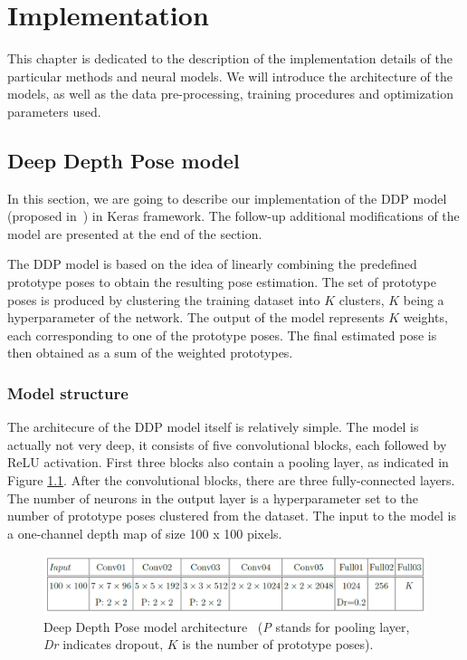 \chapter{Implementation}\label{chap:implementation}
This chapter is dedicated to the description of the implementation details of the particular methods and neural models. We will introduce the architecture of the models, as well as the data pre-processing, training procedures and optimization parameters used.

\section{Deep Depth Pose model}
In this section, we are going to describe our implementation of the DDP model (proposed in~\cite{Marin18jvcir}) in Keras framework. The follow-up additional modifications of the model are presented at the end of the section.\par
\vspace{5mm}
\noindent
The DDP model is based on the idea of linearly combining the predefined prototype poses to obtain the resulting pose estimation. The set of prototype poses is produced by clustering the training dataset into $K$ clusters, $K$ being a hyperparameter of the network. The output of the model represents $K$ weights, each corresponding to one of the prototype poses. The final estimated pose is then obtained as a sum of the weighted prototypes.


\subsection{Model structure}

The architecure of the DDP model itself is relatively simple. The model is actually not very deep, it consists of five convolutional blocks, each followed by ReLU activation. First three blocks also contain a pooling layer, as indicated in Figure \ref{fig:ddp}. After the convolutional blocks, there are three fully-connected layers. The number of neurons in the output layer is a hyperparameter set to the number of prototype poses clustered from the dataset. The input to the model is a one-channel depth map of size 100 x 100 pixels.\par

\vspace{5mm}
\begin{figure}[H]
\begin{center}
  \includegraphics[width=\textwidth]{images/implementation/ddp.PNG}
  \caption[Deep Depth Pose model architecture~\cite{Marin18jvcir}.]{Deep Depth Pose model architecture~\cite{Marin18jvcir} (\textit{P} stands for pooling layer, \textit{Dr} indicates dropout, $K$ is the number of prototype poses).}
  \label{fig:ddp}
\end{center}
\end{figure}


